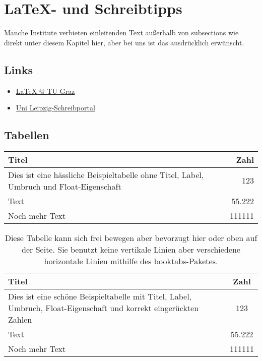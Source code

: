 \chapter{\LaTeX{}- und Schreibtipps}
Manche Institute verbieten einleitenden Text außerhalb von subsections wie direkt unter diesem Kapitel hier, aber bei uns ist das ausdrücklich erwünscht.

\section{Links}

\begin{itemize}
\item \href{https://latex.tugraz.at/}{\LaTeX{} @ TU Graz}
\item \href{https://home.uni-leipzig.de/schreibportal/}{Uni Leipzig-Schreibportal}
\end{itemize}

\section{Tabellen}

\begin{tabular}{|l|r|}
\hline
Titel									&Zahl\\
\hline
Dies ist eine hässliche Beispieltabelle	ohne Titel, Label, Umbruch und Float-Eigenschaft &123\\
Text									&55.222\\
Noch mehr Text							&111111\\
\hline
\end{tabular}

\begin{table}[ht]
\begin{tabulary}{\textwidth}{LS}
\toprule
Titel									&Zahl\\
\midrule
Dies ist eine schöne Beispieltabelle mit Titel, Label, Umbruch, Float-Eigenschaft und korrekt eingerückten Zahlen	&123\\
Text																												&55.222\\
Noch mehr Text																										&111111\\
\bottomrule
\end{tabulary}
\caption{Diese Tabelle kann sich frei bewegen aber bevorzugt hier oder oben auf der Seite. Sie benutzt keine vertikale Linien aber verschiedene horizontale Linien mithilfe des booktabs-Paketes.}
\label{tab:exampletable}
\end{table}


